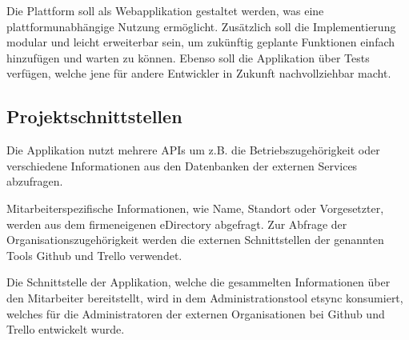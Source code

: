 Die Plattform soll als Webapplikation gestaltet werden, was eine plattformunabhängige Nutzung
ermöglicht. Zusätzlich soll die Implementierung modular und leicht erweiterbar
sein, um zukünftig geplante Funktionen einfach hinzufügen und warten zu können. Ebenso soll die
Applikation über Tests verfügen, welche jene für andere Entwickler in Zukunft nachvollziehbar macht.

\subsection{Projektschnittstellen}
\label{sec:Projektschnittstellen}
Die Applikation nutzt mehrere APIs um z.B. die Betriebszugehörigkeit oder verschiedene Informationen
aus den Datenbanken der externen Services abzufragen.

Mitarbeiterspezifische Informationen, wie Name, Standort oder Vorgesetzter, werden aus dem
firmeneigenen eDirectory abgefragt.
Zur Abfrage der Organisationszugehörigkeit werden die externen Schnittstellen der genannten Tools
Github und Trello verwendet.

Die Schnittstelle der Applikation, welche die gesammelten Informationen über den Mitarbeiter
bereitstellt, wird in dem Administrationstool etsync konsumiert, welches für die Administratoren
der externen Organisationen bei Github und Trello entwickelt wurde.
